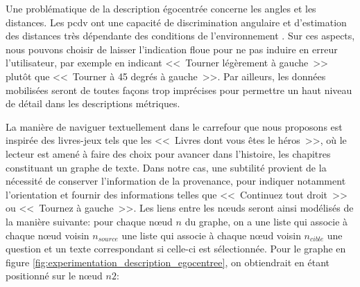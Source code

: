 Une problématique de la description égocentrée concerne les angles et les distances. Les \gls{pcdv} ont une capacité de discrimination angulaire et d’estimation des distances très dépendante des conditions de l’environnement \citep{ratelle_manuel_2019}. Sur ces aspects, nous pouvons choisir de laisser l'indication floue pour ne pas induire en erreur l'utilisateur, par exemple en indicant <<~Tourner légèrement à gauche~>> plutôt que <<~Tourner à 45 degrés à gauche~>>. Par ailleurs, les données mobilisées seront de toutes façons trop imprécises pour permettre un haut niveau de détail dans les descriptions métriques.

\newpar{}

La manière de naviguer textuellement dans le carrefour que nous proposons est inspirée des livres-jeux tels que les <<~Livres dont vous êtes le héros~>>, où le lecteur est amené à faire des choix pour avancer dans l'histoire, les chapitres constituant un graphe de texte. Dans notre cas, une subtilité provient de la nécessité de conserver l'information de la provenance, pour indiquer notamment l'orientation et fournir des informations telles que <<~Continuez tout droit~>> ou <<~Tournez à gauche~>>. Les liens entre les nœuds seront ainsi modélisés de la manière suivante: pour chaque nœud $n$ du graphe, on a une liste qui associe à chaque nœud voisin $n_{source}$ une liste qui associe à chaque nœud voisin $n_{cible}$ une question et un texte correspondant si celle-ci est sélectionnée. Pour le graphe en figure \ref{fig:experimentation_description_egocentree}, on obtiendrait en étant positionné sur le nœud $n2$:

